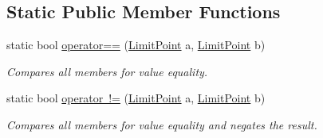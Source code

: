 \subsection*{Static Public Member Functions}
\begin{DoxyCompactItemize}
\item 
static bool \mbox{\hyperlink{class_c_s_i_1_1_library_1_1_array_utilities_1_1_array_limit_checks_1_1_limit_point_a81b0681d6e544eaa37b7d08857b568f1}{operator==}} (\mbox{\hyperlink{class_c_s_i_1_1_library_1_1_array_utilities_1_1_array_limit_checks_1_1_limit_point}{Limit\+Point}} a, \mbox{\hyperlink{class_c_s_i_1_1_library_1_1_array_utilities_1_1_array_limit_checks_1_1_limit_point}{Limit\+Point}} b)
\begin{DoxyCompactList}\small\item\em Compares all members for value equality. \end{DoxyCompactList}\item 
static bool \mbox{\hyperlink{class_c_s_i_1_1_library_1_1_array_utilities_1_1_array_limit_checks_1_1_limit_point_afb6b7605ba69f3a6f9f8c3547f026b60}{operator !=}} (\mbox{\hyperlink{class_c_s_i_1_1_library_1_1_array_utilities_1_1_array_limit_checks_1_1_limit_point}{Limit\+Point}} a, \mbox{\hyperlink{class_c_s_i_1_1_library_1_1_array_utilities_1_1_array_limit_checks_1_1_limit_point}{Limit\+Point}} b)
\begin{DoxyCompactList}\small\item\em Compares all members for value equality and negates the result. \end{DoxyCompactList}\end{DoxyCompactItemize}
